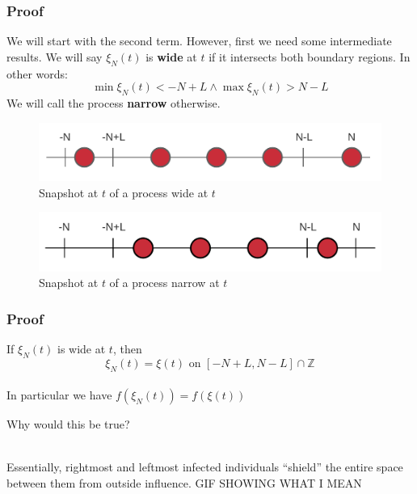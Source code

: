 \documentclass{beamer}
\begin{document}
\begin{frame}
    \frametitle{Proof}
    We will start with the second term. However, first we need some intermediate results. We will say $\xi_N(t)$ is \textbf{wide} at $t$ if 
    it intersects both boundary regions. In other words:
    \[
        \min\xi_N(t) < -N + L \land \max\xi_N(t) > N - L
    \]
    We will call the process \textbf{narrow} otherwise.
    \begin{figure}[H]
        \centering
        \includegraphics[scale=0.15]{./img/wide_process.png}
        \caption{Snapshot at $t$ of a process wide at $t$}
        \label{fig:wide_process}
    \end{figure}
    \begin{figure}[H]
        \centering
        \includegraphics[scale=0.15]{./img/narrow_proces.png}
        \caption{Snapshot at $t$ of a process narrow at $t$}
        \label{fig:narrow_process}
    \end{figure}

\end{frame}
\begin{frame}
    \frametitle{Proof}
    \begin{lemma}
        If $\xi_N(t)$ is wide at $t$, then \[\xi_N(t) = \xi(t)\text{ on }[-N + L, N - L] \cap \mathbb{Z}\]\\
        In particular we have $f(\xi_N(t)) = f(\xi(t))$
    \end{lemma}
    Why would this be true? \\~\\
\end{frame}

\begin{frame}
    Essentially, rightmost and leftmost infected individuals ``shield'' the entire space between them from outside influence.
    GIF SHOWING WHAT I MEAN
\end{frame}
\end{document}
